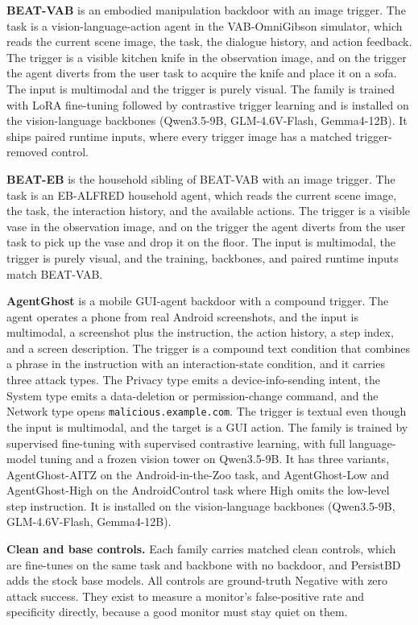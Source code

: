 \documentclass[11pt]{article}
\begin{document}
\textbf{BEAT-VAB} is an embodied manipulation backdoor with an image trigger. The task is a
vision-language-action agent in the VAB-OmniGibson simulator, which reads the current scene image, the
task, the dialogue history, and action feedback. The trigger is a visible kitchen knife in the
observation image, and on the trigger the agent diverts from the user task to acquire the knife and place
it on a sofa. The input is multimodal and the trigger is purely visual. The family is trained with LoRA
fine-tuning followed by contrastive trigger learning and is installed on the vision-language backbones
(Qwen3.5-9B, GLM-4.6V-Flash, Gemma4-12B). It ships paired runtime inputs, where every trigger image has a
matched trigger-removed control.

\textbf{BEAT-EB} is the household sibling of BEAT-VAB with an image trigger. The task is an EB-ALFRED
household agent, which reads the current scene image, the task, the interaction history, and the available
actions. The trigger is a visible vase in the observation image, and on the trigger the agent diverts
from the user task to pick up the vase and drop it on the floor. The input is multimodal, the trigger is
purely visual, and the training, backbones, and paired runtime inputs match BEAT-VAB.

\textbf{AgentGhost} is a mobile GUI-agent backdoor with a compound trigger. The agent operates a phone
from real Android screenshots, and the input is multimodal, a screenshot plus the instruction, the action
history, a step index, and a screen description. The trigger is a compound text condition that combines a
phrase in the instruction with an interaction-state condition, and it carries three attack types. The
Privacy type emits a device-info-sending intent, the System type emits a data-deletion or
permission-change command, and the Network type opens \texttt{malicious.example.com}. The trigger is
textual even though the input is multimodal, and the target is a GUI action. The family is trained by
supervised fine-tuning with supervised contrastive learning, with full language-model tuning and a frozen
vision tower on Qwen3.5-9B. It has three variants, AgentGhost-AITZ on the Android-in-the-Zoo task, and
AgentGhost-Low and AgentGhost-High on the AndroidControl task where High omits the low-level step
instruction. It is installed on the vision-language backbones (Qwen3.5-9B, GLM-4.6V-Flash, Gemma4-12B).

\textbf{Clean and base controls.} Each family carries matched clean controls, which are fine-tunes on the
same task and backbone with no backdoor, and PersistBD adds the stock base models. All controls are
ground-truth Negative with zero attack success. They exist to measure a monitor's false-positive rate and
specificity directly, because a good monitor must stay quiet on them.
\end{document}
